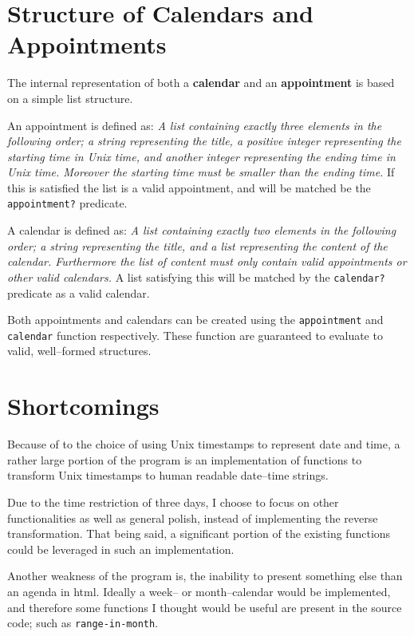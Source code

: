 \section{Structure of Calendars and Appointments}
The internal representation of both a \textbf{calendar} and an \textbf{appointment} is based on a simple list structure.

\medskip
An appointment is defined as: \textit{A list containing exactly three elements in the following order; a string representing the title, a positive integer representing the starting time in Unix time, and another integer representing the ending time in Unix time. Moreover the starting time must be smaller than the ending time.}
If this is satisfied the list is a valid appointment, and will be matched be the \texttt{appointment?} predicate.

\medskip
A calendar is defined as: \textit{A list containing exactly two elements in the following order; a string representing the title, and a list representing the content of the calendar. Furthermore the list of content must only contain valid appointments or other valid calendars.}
A list satisfying this will be matched by the \texttt{calendar?} predicate as a valid calendar.

\medskip
Both appointments and calendars can be created using the \texttt{appointment} and \texttt{calendar} function respectively.
These function are guaranteed to evaluate to valid, well--formed structures.

\section{Shortcomings}
Because of to the choice of using Unix timestamps to represent date and time, a rather large portion of the program is an implementation of functions to transform Unix timestamps to human readable date--time strings.

Due to the time restriction of three days, I choose to focus on other functionalities as well as general polish, instead of implementing the reverse transformation.
That being said, a significant portion of the existing functions could be leveraged in such an implementation.

\medskip
Another weakness of the program is, the inability to present something else than an agenda in html.
Ideally a week-- or month--calendar would be implemented, and therefore some functions I thought would be useful
are present in the source code; such as \texttt{range-in-month}.




